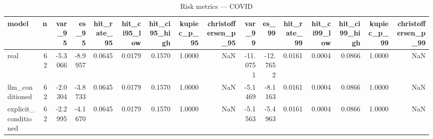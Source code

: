 \begin{table}
\caption{Risk metrics — COVID}
\label{tab:risk_COVID}
\begin{tabular}{lrrrrrrrrrrrrrrr}
\toprule
model & n & var\_95 & es\_95 & hit\_rate\_95 & hit\_ci95\_low & hit\_ci95\_high & kupiec\_p\_95 & christoffersen\_p\_95 & var\_99 & es\_99 & hit\_rate\_99 & hit\_ci99\_low & hit\_ci99\_high & kupiec\_p\_99 & christoffersen\_p\_99 \\
\midrule
real & 62 & -5.3066 & -8.9957 & 0.0645 & 0.0179 & 0.1570 & 1.0000 & NaN & -11.0751 & -12.7652 & 0.0161 & 0.0004 & 0.0866 & 1.0000 & NaN \\
llm\_conditioned & 62 & -2.0304 & -3.8733 & 0.0645 & 0.0179 & 0.1570 & 1.0000 & NaN & -5.1469 & -8.1163 & 0.0161 & 0.0004 & 0.0866 & 1.0000 & NaN \\
explicit\_conditioned & 62 & -2.2995 & -4.1670 & 0.0645 & 0.0179 & 0.1570 & 1.0000 & NaN & -5.1563 & -5.4963 & 0.0161 & 0.0004 & 0.0866 & 1.0000 & NaN \\
\bottomrule
\end{tabular}
\end{table}
